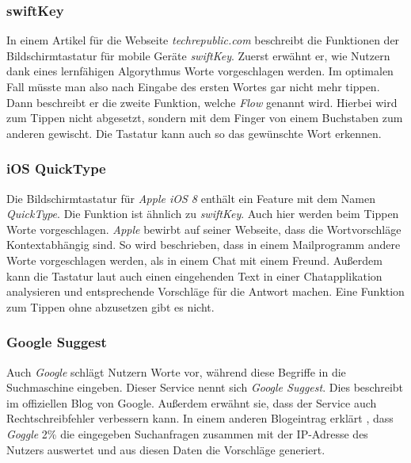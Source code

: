         \subsubsection*{swiftKey}
        	In einem Artikel für die Webseite \emph{techrepublic.com} beschreibt \cite{techrepublic:swiftKey} die Funktionen der Bildschirmtastatur für mobile Geräte \emph{swiftKey}. Zuerst erwähnt er, wie Nutzern dank eines lernfähigen Algorythmus Worte vorgeschlagen werden. Im optimalen Fall müsste man also nach Eingabe des ersten Wortes gar nicht mehr tippen. Dann beschreibt er die zweite Funktion, welche \emph{Flow} genannt wird. Hierbei wird zum Tippen nicht abgesetzt, sondern mit dem Finger von einem Buchstaben zum anderen gewischt. Die Tastatur kann auch so das gewünschte Wort erkennen.
        
        
        \subsubsection*{iOS QuickType}
        
        	Die Bildschirmtastatur für \emph{Apple iOS 8} enthält ein Feature mit dem Namen \emph{QuickType}. Die Funktion ist ähnlich zu \emph{swiftKey}. Auch hier werden beim Tippen Worte vorgeschlagen. \emph{Apple} bewirbt auf seiner Webseite, dass die Wortvorschläge Kontextabhängig sind. So wird beschrieben, dass in einem Mailprogramm andere Worte vorgeschlagen werden, als in einem Chat mit einem Freund. Außerdem kann die Tastatur laut \cite{apple:quickType} auch einen eingehenden Text in einer Chatapplikation analysieren und entsprechende Vorschläge für die Antwort machen. Eine Funktion zum Tippen ohne abzusetzen gibt es nicht.
        
        \subsubsection*{Google Suggest}
        
        	Auch \emph{Google} schlägt Nutzern Worte vor, während diese Begriffe in die Suchmaschine eingeben. Dieser Service nennt sich \emph{Google Suggest}. Dies beschreibt \cite{google:suggestIntro} im offiziellen Blog von Google. Außerdem erwähnt sie, dass der Service auch Rechtschreibfehler verbessern kann. In einem anderen Blogeintrag erklärt \cite{google:suggestUpdate}, dass \emph{Goggle} 2\% die eingegeben Suchanfragen zusammen mit der IP-Adresse des Nutzers auswertet und aus diesen Daten die Vorschläge generiert.
    
    
    
    \newpage